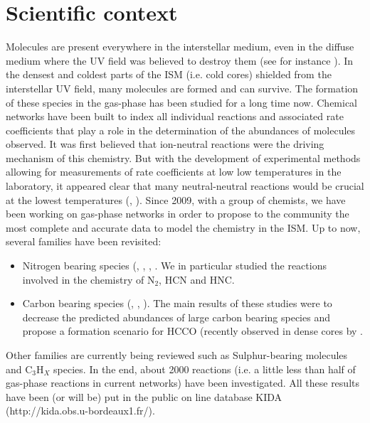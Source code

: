 \section{Scientific context} 

Molecules are present everywhere in the interstellar medium, even in the diffuse medium where the UV field was believed to destroy them (see for instance \cite{2012ApJ...753L..28L}). In the densest and coldest parts of the ISM (i.e. cold cores) shielded from the interstellar UV field, many molecules are formed and can survive. The formation of these species in the gas-phase has been studied for a long time now. Chemical networks have been built to index all individual reactions and associated rate coefficients that play a role in the determination of the abundances of molecules observed. It was first believed that ion-neutral reactions were the driving mechanism of this chemistry. But with the development of experimental methods allowing for measurements of rate coefficients at low low temperatures in the laboratory, it appeared clear that many neutral-neutral reactions would be crucial at the lowest temperatures (\cite{2010SSRv..156...13W}, \cite{Smith_2011}). Since 2009, with a group of chemists, we have been working on gas-phase networks in order to propose to the community the most complete and accurate data to model the chemistry in the ISM. Up to now, several families have been revisited: 
\begin{itemize}
\item{Nitrogen bearing species (\cite{2013PCCP...1513888D}, \cite{2012PNAS..10910233D}, \cite{2014MNRAS.443..398L}, \cite{2013arXiv1310.4350W}. We in particular studied the reactions involved in the chemistry of N$_2$, HCN and HNC.} 
\item{Carbon bearing species (\cite{Wakelam_2009}, \cite{2014MNRAS.437..930L}, \cite{2015MNRAS.453L..48W}). The main results of these studies were to decrease the predicted abundances of large carbon bearing species and propose a formation scenario for HCCO (recently observed in dense cores by \cite{Ag_ndez_2015}.} 
\end{itemize}
Other families are currently being reviewed such as Sulphur-bearing molecules and C$_3$H$_X$ species. In the end, about 2000 reactions (i.e. a little less than half of gas-phase reactions in current networks) have been investigated. All these results have been (or will be) put in the public on line database KIDA (http://kida.obs.u-bordeaux1.fr/). \\
